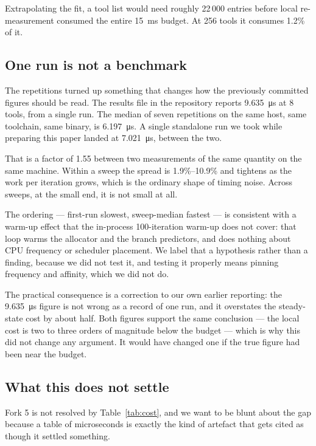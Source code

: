 \documentclass[11pt]{article}
\begin{document}
Extrapolating the fit, a tool list would need roughly 22\,000 entries before
local re-measurement consumed the entire \SI{15}{\milli\second} budget. At
256 tools it consumes 1.2\% of it.

\subsection{One run is not a benchmark}

The repetitions turned up something that changes how the previously committed
figures should be read. The results file in the repository reports
\SI{9.635}{\micro\second} at 8 tools, from a single run. The median of seven
repetitions on the same host, same toolchain, same binary, is
\SI{6.197}{\micro\second}. A single standalone run we took while preparing
this paper landed at \SI{7.021}{\micro\second}, between the two.

That is a factor of 1.55 between two measurements of the same quantity on the
same machine. Within a sweep the spread is 1.9\%--10.9\% and tightens as the
work per iteration grows, which is the ordinary shape of timing noise. Across
sweeps, at the small end, it is not small at all.

The ordering --- first-run slowest, sweep-median fastest --- is consistent
with a warm-up effect that the in-process 100-iteration warm-up does not
cover: that loop warms the allocator and the branch predictors, and does
nothing about CPU frequency or scheduler placement. We label that a hypothesis
rather than a finding, because we did not test it, and testing it properly
means pinning frequency and affinity, which we did not do.

The practical consequence is a correction to our own earlier reporting: the
\SI{9.635}{\micro\second} figure is not wrong as a record of one run, and it
overstates the steady-state cost by about half. Both figures support the same
conclusion --- the local cost is two to three orders of magnitude below the
budget --- which is why this did not change any argument. It would have
changed one if the true figure had been near the budget.

\subsection{What this does not settle}

Fork 5 is not resolved by Table~\ref{tab:cost}, and we want to be blunt about
the gap because a table of microseconds is exactly the kind of artefact that
gets cited as though it settled something.
\end{document}
